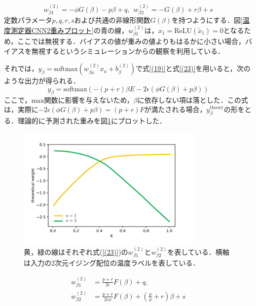 \documentclass[a4paper,11pt]{jsreport}
\begin{document}
\begin{equation}
  w_{\beta 1}^{(2)} = -\phi G(\beta) - p\beta + q, \ \
  w_{\beta 2}^{(2)} = -G(\beta) + r\beta + s \label{(23)}
\end{equation}
定数パラメータ$p,q,r,s$および共通の非線形関数$G(\beta)$を持つようにする．図\ref{温度測定器CNN2重みプロット}の青の線，$w^{(2)}_{\beta 1}$は，$x_1 = \text{ReLU}(\tilde{x}_1) = 0$となるため，ここでは無視する．バイアスの値が重みの値よりもはるかに小さい場合，バイアスを無視するというシミュレーションからの観察を利用している．\par
それでは，$y_{\beta} = \text{softmax}(w_{\beta a}^{(2)}x_a + b_{\beta}^{(2)})$で式\ref{(19)}と式\ref{(23)}を用いると，次のような出力が得られる．
\begin{equation}
  y_{\beta} = \text{softmax}(-(p+r)\beta E - 2\epsilon(\phi G(\beta) + p\beta))
\end{equation}
ここで，$\text{max}$関数に影響を与えないため，$\beta$に依存しない項は落とした．この式は，実際に$-2\epsilon (\phi G(\beta) + p\beta) = (p + r)F$が満たされる場合，$y_{\beta}^{\text{theory}}$の形をとる．理論的に予測された重みを図\ref{温度測定器2理論的重み}にプロットした．

\begin{figure}[H]
  \begin{center}
    \includegraphics[height=6cm]{image/温度測定器2理論的重み.png}
    \caption{黄，緑の線はそれぞれ式(\ref{(23)})の$w_{\beta 1}^{(2)}$と$w_{\beta 2}^{(2)}$を表している．横軸は入力の2次元イジング配位の温度ラベルを表している．}
    \label{温度測定器2理論的重み}
  \end{center}
\end{figure}

\begin{align}
  w_{\beta 1}^{(2)} &= \frac{p+r}{2\epsilon}F(\beta) + q, \\
  w_{\beta 2}^{(2)} &= \frac{p+r}{2\epsilon \phi}F(\beta) + \left( \frac{p}{\phi} + r \right)\beta + s
\end{align}
\end{document}
